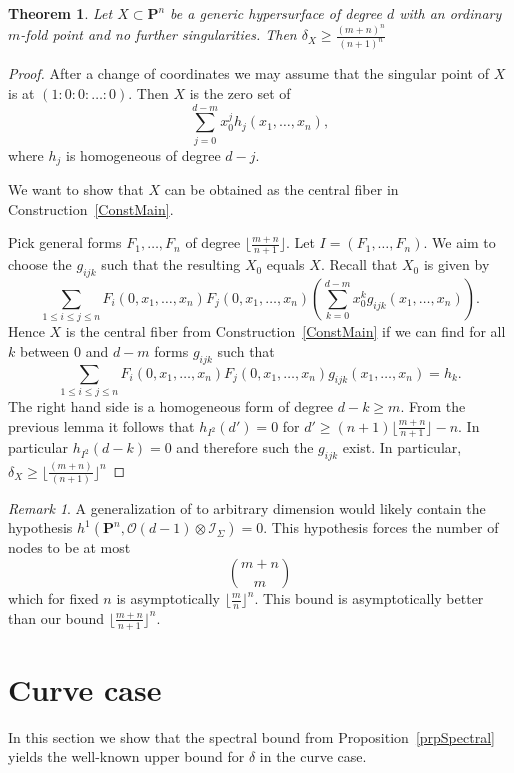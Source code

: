 \documentclass{amsart}
\newcommand{\Ps}{\mathbf{P}}
\newcommand{\cO}{\mathcal{O}}
\newcommand{\cI}{\mathcal{I}}
\newtheorem{theorem}[lemma]{Theorem}
\theoremstyle{definition}
\theoremstyle{remark}
\newtheorem{remark}[lemma]{Remark}
\begin{document}
\begin{theorem}\label{thmAll} Let $X\subset \Ps^n$ be a generic hypersurface of degree $d$ with an ordinary $m$-fold point and no further singularities. Then $\delta_X \geq \frac{(m+n)^n}{(n+1)^n}$
\end{theorem}

\begin{proof}
After a change of coordinates we may assume that the singular point of $X$ is at $(1:0:0:\dots:0)$. Then $X$ is the zero set of
\[ \sum_{j=0}^{d-m} x_0^j h_j(x_1,\dots,x_n),\]
where $h_j$ is homogeneous of degree $d-j$.

We want  to show that $X$  can be obtained as the central fiber in Construction~\ref{ConstMain}.

Pick  general forms $F_1,\dots,F_n$ of degree $\lfloor \frac{m+n}{n+1}\rfloor$. Let $I=(F_1,\dots,F_n)$. We aim to choose 
 the $g_{ijk}$ such that the resulting $X_0$ equals $X$.
Recall that $X_0$ is given by
\[ \sum_{1\leq i \leq j \leq n} F_i(0,x_1,\dots,x_n)F_j(0,x_1,\dots,x_n)\left(\sum_{k=0}^{d-m} x_0^{k} g_{ijk}(x_1,\dots,x_n)\right).\]
Hence $X$ is the central fiber from  Construction~\ref{ConstMain} if we can find for all $k$ between $0$ and $d-m$ forms $g_{ijk}$ such that
\[ \sum_{1\leq i \leq j \leq n} F_i(0,x_1,\dots,x_n)F_j(0,x_1,\dots,x_n) g_{ijk}(x_1,\dots,x_n) =h_k.\]
The right hand side is a homogeneous form of degree $d-k\geq m$. From the previous lemma it follows that $h_{I^2}(d')=0$ for $d'\geq (n+1) \lfloor \frac{m+n}{n+1}\rfloor -n$. In particular $h_{I^2}(d-k)=0$ and therefore such the $g_{ijk}$ exist.
In particular,  $\delta_X \geq \lfloor \frac{(m+n)}{(n+1)}\rfloor ^n$
\end{proof}

\begin{remark}  A generalization of \cite[Theorem 3.3]{CiGa26} to arbitrary dimension would likely contain the hypothesis $h^1(\Ps^n,\cO(d-1)\otimes \cI_{\Sigma})=0$. This hypothesis forces the number of nodes to be at most 
\[ \binom{m+n}{m}\]
which for fixed $n$  is asymptotically $\lfloor \frac{m}{n}\rfloor^n$. This bound is asymptotically   better than our bound $\lfloor \frac{m+n}{n+1}\rfloor^n$.
\end{remark}


\section{Curve case}\label{secCurve}

In this section we show that the spectral bound from Proposition~\ref{prpSpectral} yields the well-known upper bound for $\delta$ in the curve case.
\end{document}
